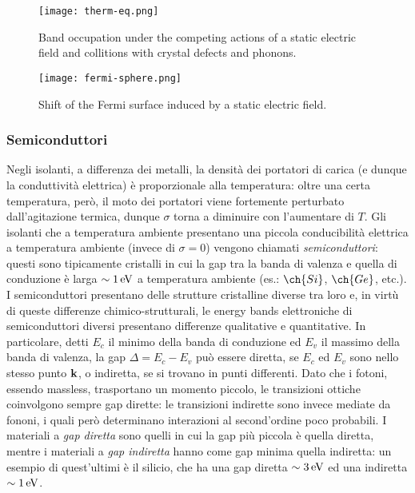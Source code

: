 \begin{figure}
	\centering
	\texttt{[image: therm-eq.png]}
	\caption{Band occupation under the competing actions of a static electric field and collitions with crystal defects and phonons.}
	\label{therm-eq}
\end{figure}
\begin{figure}
	\centering
	\texttt{[image: fermi-sphere.png]}
	\caption{Shift of the Fermi surface induced by a static electric field.}
	\label{f-sph}
\end{figure}

\subsubsection{Semiconduttori}

Negli isolanti, a differenza dei metalli, la densità dei portatori di carica (e dunque la conduttività elettrica) è proporzionale alla temperatura: oltre una certa temperatura, però, il moto dei portatori viene fortemente perturbato dall'agitazione termica, dunque $ \sigma $ torna a diminuire con l'aumentare di $ T $. Gli isolanti che a temperatura ambiente presentano una piccola conducibilità elettrica a temperatura ambiente (invece di $ \sigma = 0 $) vengono chiamati \textit{semiconduttori}: questi sono tipicamente cristalli in cui la gap tra la banda di valenza e quella di conduzione è larga $ \sim 1\,\mathrm{eV} $ a temperatura ambiente (es.: $ \ch{Si} $, $ \ch{Ge} $, etc.). \\
I semiconduttori presentano delle strutture cristalline diverse tra loro e, in virtù di queste differenze chimico-strutturali, le energy bands elettroniche di semiconduttori diversi presentano differenze qualitative e quantitative. In particolare, detti $ E_c $ il minimo della banda di conduzione ed $ E_v $ il massimo della banda di valenza, la gap $ \Delta = E_c - E_v $ può essere diretta, se $ E_c $ ed $ E_v $ sono nello stesso punto $ \mathbf{k} $, o indiretta, se si trovano in punti differenti. Dato che i fotoni, essendo massless, trasportano un momento piccolo, le transizioni ottiche coinvolgono sempre gap dirette: le transizioni indirette sono invece mediate da fononi, i quali però determinano interazioni al second'ordine poco probabili. I materiali a \textit{gap diretta} sono quelli in cui la gap più piccola è quella diretta, mentre i materiali a \textit{gap indiretta} hanno come gap minima quella indiretta: un esempio di quest'ultimi è il silicio, che ha una gap diretta $ \sim 3\,\mathrm{eV} $ ed una indiretta $ \sim 1\,\mathrm{eV} $.

